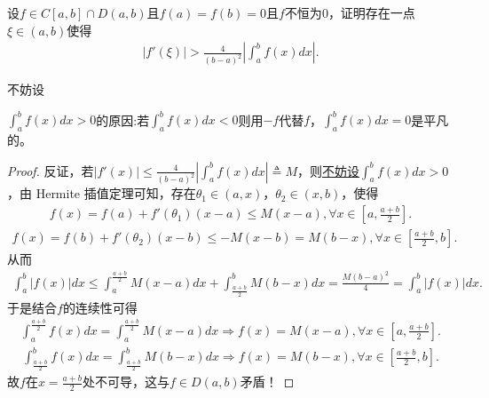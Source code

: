 \documentclass[../../main.tex]{subfiles}
\begin{document}
\begin{example}
设\(f \in C[a,b]\cap D(a,b)\)且\(f(a) = f(b) = 0\)且\(f\)不恒为\(0\)，证明存在一点\(\xi \in (a,b)\)使得
\begin{align*}
|f'(\xi)| > \frac{4}{(b - a)^2}\left|\int_{a}^{b}f(x)dx\right|.
\end{align*} 
\end{example}
\begin{remark}
\hypertarget{example0.5----:不妨设的原因}{不妨设}\(\int_{a}^{b}f(x)dx > 0\)的原因:若\(\int_{a}^{b}f(x)dx < 0\)则用\(-f\)代替\(f\)，\(\int_{a}^{b}f(x)dx = 0\)是平凡的。
\end{remark}
\begin{proof}
反证，若\(|f'(x)| \leqslant \frac{4}{(b - a)^2}\left|\int_{a}^{b}f(x)dx\right| \triangleq M\)，则\hyperlink{example0.5----:不妨设的原因}{不妨设\(\int_{a}^{b}f(x)dx > 0\)}，由 Hermite 插值定理可知，存在\(\theta_1 \in (a, x)\)，\(\theta_2 \in (x, b)\)，使得
\begin{align*}
f(x) = f(a) + f'(\theta_1)(x - a) \leqslant M(x - a), \forall x \in \left[a, \frac{a + b}{2}\right].
\end{align*}
\begin{align*}
f(x) = f(b) + f'(\theta_2)(x - b) \leqslant -M(x - b) = M(b - x), \forall x \in \left[\frac{a + b}{2}, b\right].
\end{align*}
从而
\begin{align*}
\int_{a}^{b}|f(x)|dx \leqslant \int_{a}^{\frac{a + b}{2}}M(x - a)dx + \int_{\frac{a + b}{2}}^{b}M(b - x)dx = \frac{M(b - a)^2}{4} = \int_{a}^{b}|f(x)|dx.
\end{align*}
于是结合\(f\)的连续性可得
\begin{align*}
\int_{a}^{\frac{a + b}{2}}f(x)dx = \int_{a}^{\frac{a + b}{2}}M(x - a)dx \Rightarrow f(x) = M(x - a), \forall x \in \left[a, \frac{a + b}{2}\right].
\end{align*}
\begin{align*}
\int_{\frac{a + b}{2}}^{b}f(x)dx = \int_{\frac{a + b}{2}}^{b}M(b - x)dx \Rightarrow f(x) = M(b - x), \forall x \in \left[\frac{a + b}{2}, b\right].
\end{align*}
故\(f\)在\(x = \frac{a + b}{2}\)处不可导，这与\(f \in D(a, b)\)矛盾！
\end{proof}
\end{document}
